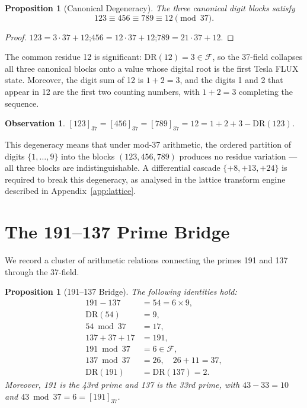 \documentclass[12pt]{article}
\newtheorem{proposition}[theorem]{Proposition}
\newtheorem{observation}[theorem]{Observation}
\begin{document}
\begin{proposition}[Canonical Degeneracy]
\label{prop:canon}
The three canonical digit blocks satisfy
\[
    123 \equiv 456 \equiv 789 \equiv 12 \pmod{37}.
\]
\end{proposition}

\begin{proof}
$123 = 3\cdot37 + 12$;\quad $456 = 12\cdot37 + 12$;\quad $789 = 21\cdot37 + 12$.
\end{proof}

The common residue 12 is significant: $\mathrm{DR}(12) = 3 \in \mathcal{F}$,
so the 37-field collapses all three canonical blocks onto a value whose digital
root is the first Tesla FLUX state.  Moreover, the digit sum of 12 is $1+2=3$,
and the digits 1 and 2 that appear in 12 are the first two counting numbers,
with $1+2=3$ completing the sequence.

\begin{observation}
$[123]_{37} = [456]_{37} = [789]_{37} = 12 = 1+2+3-\mathrm{DR}(123)$.
\end{observation}

This degeneracy means that under mod-37 arithmetic, the ordered partition of
digits $\{1,\ldots,9\}$ into the blocks $(123,456,789)$ produces no residue
variation --- all three blocks are indistinguishable.  A differential cascade
$\{+8, +13, +24\}$ is required to break this degeneracy, as analysed in the
lattice transform engine described in Appendix~\ref{app:lattice}.

\section{The 191--137 Prime Bridge}
\label{sec:bridge}

We record a cluster of arithmetic relations connecting the primes 191 and 137
through the 37-field.

\begin{proposition}[191--137 Bridge]
\label{prop:bridge}
The following identities hold:
\begin{align}
    191 - 137 &= 54 = 6 \times 9, \label{eq:gap}\\
    \mathrm{DR}(54) &= 9, \label{eq:dr54}\\
    54 \bmod 37 &= 17, \label{eq:bridge_seed}\\
    137 + 37 + 17 &= 191, \label{eq:lift}\\
    191 \bmod 37 &= 6 \in \mathcal{F}, \label{eq:tesla}\\
    137 \bmod 37 &= 26,\quad 26+11=37, \label{eq:complement}\\
    \mathrm{DR}(191) &= \mathrm{DR}(137) = 2. \label{eq:resonance}
\end{align}
Moreover, 191 is the 43rd prime and 137 is the 33rd prime, with
$43 - 33 = 10$ and $43\bmod 37 = 6 = [191]_{37}$.
\end{proposition}
\end{document}
